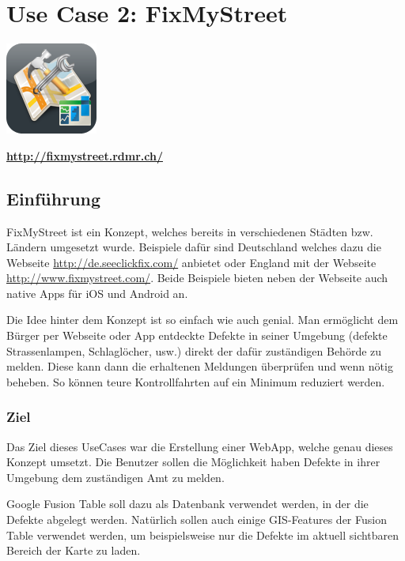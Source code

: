 \chapter{Use Case 2: FixMyStreet}
\label{fixmystreet}

\begin{center}
\includegraphics[scale=0.8]{images/usecase2-fixmystreet/fixmystreet-icon_with_gloss.png}

{\large \textbf{\url{http://fixmystreet.rdmr.ch/}}}
\end{center}

\section{Einführung}
FixMyStreet ist ein Konzept, welches bereits in verschiedenen Städten bzw. Ländern umgesetzt wurde. Beispiele dafür sind Deutschland welches dazu die Webseite  \url{http://de.seeclickfix.com/} anbietet oder England mit der Webseite \url{http://www.fixmystreet.com/}. Beide Beispiele bieten neben der Webseite auch native Apps für iOS und Android an.

Die Idee hinter dem Konzept ist so einfach wie auch genial. Man ermöglicht dem Bürger per Webseite oder App entdeckte Defekte in seiner Umgebung (defekte Strassenlampen, Schlaglöcher, usw.) direkt der dafür zuständigen Behörde zu melden. Diese kann dann die erhaltenen Meldungen überprüfen und wenn nötig beheben. So können teure Kontrollfahrten auf ein Minimum reduziert werden.

\subsection{Ziel}
Das Ziel dieses UseCases war die Erstellung einer WebApp, welche genau dieses Konzept umsetzt. Die Benutzer sollen die Möglichkeit haben Defekte in ihrer Umgebung dem zuständigen Amt zu melden.

Google Fusion Table soll dazu als Datenbank verwendet werden, in der die Defekte abgelegt werden. Natürlich sollen auch einige GIS-Features der Fusion Table verwendet werden, um beispielsweise nur die Defekte im aktuell sichtbaren Bereich der Karte zu laden.

